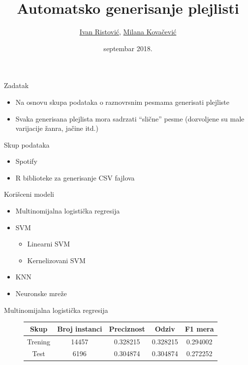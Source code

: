 \documentclass{beamer}
\title{Automatsko generisanje plejlisti}
\author{\href{mailto:mi14031@matf.bg.ac.rs}{Ivan Ristović}, \href{mailto:mi14042@matf.bg.ac.rs}{Milana Kovačević}
}
\date{septembar 2018.}
\begin{document}
\begin{frame}
    \titlepage
\end{frame}

\begin{frame}{Zadatak}
    \begin{itemize}
        \item Na osnovu skupa podataka o raznovrsnim pesmama generisati plejliste
        \item Svaka generisana plejlista mora sadrzati ``sli\v{c}ne'' pesme (dozvoljene su male varijacije \v{z}anra, ja\v{c}ine itd.)
    \end{itemize}
\end{frame}

\begin{frame}{Skup podataka}
    \begin{itemize}
        \item Spotify
        \item R biblioteke za generisanje CSV fajlova
    \end{itemize}
\end{frame}

\begin{frame}{Kori\v{s}ceni modeli}
    \begin{itemize}
        \item Multinomijalna logisti\v{c}ka regresija
        \item SVM
        \begin{itemize}
            \item Linearni SVM
            \item Kernelizovani SVM
        \end{itemize}
        \item KNN
        \item Neuronske mre\v{z}e
    \end{itemize}
\end{frame}

\begin{frame}[fragile]{Multinomijalna logisti\v{c}ka regresija}
    \begin{figure}[!h]
    \centering
    \begin{tabular}{ | c | c | c | c | c |}
        \hline
        Skup & Broj instanci & Preciznost & Odziv & F1 mera \\
        \hline
        Trening & 14457 & 0.328215 & 0.328215 & 0.294002 \\
        Test & 6196 & 0.304874 & 0.304874 & 0.272252 \\
        \hline
    \end{tabular}
    \end{figure}
\end{frame}
\end{document}

